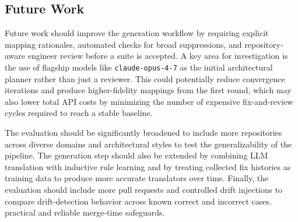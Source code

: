\documentclass[sigconf,screen]{acmart}
\begin{document}
\subsection{Future Work}
Future work should improve the generation workflow by requiring explicit mapping rationales, automated checks for broad suppressions, and repository-aware engineer review before a suite is accepted. A key area for investigation is the use of flagship models like \texttt{claude-opus-4-7} as the initial architectural planner rather than just a reviewer. This could potentially reduce convergence iterations and produce higher-fidelity mappings from the first round, which may also lower total API costs by minimizing the number of expensive fix-and-review cycles required to reach a stable baseline. 

The evaluation should be significantly broadened to include more repositories across diverse domains and architectural styles to test the generalizability of the pipeline. The generation step should also be extended by combining LLM translation with inductive rule learning \cite{schindler2024} and by treating collected fix histories as training data to produce more accurate translators over time. Finally, the evaluation should include more pull requests and controlled drift injections to compare drift-detection behavior across known correct and incorrect cases.
practical and reliable merge-time safeguards.









\appendix

\end{document}
